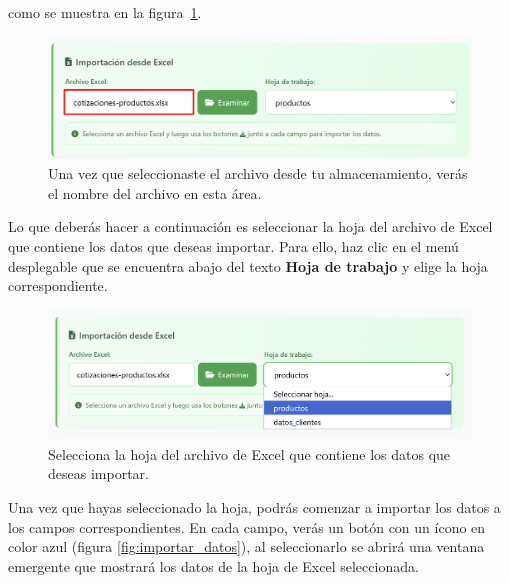 \documentclass{Pretexto/bluereport}
\begin{document}
\begin{minipage}
como se muestra en la figura~\ref{fig:archivos_cargados}.
\begin{figure}[H] 
    \centering
        \includegraphics[width=0.7\linewidth]{img/archivos_cargados.png}
    \caption{Una vez que seleccionaste el archivo desde tu almacenamiento, verás el nombre del archivo en esta área.}
    \label{fig:archivos_cargados}
\end{figure}
Lo que deberás hacer a continuación es seleccionar la hoja del archivo de Excel que contiene los datos que deseas importar. 
Para ello, haz clic en el menú desplegable que se encuentra abajo del texto  \textbf{Hoja de trabajo} y elige la hoja correspondiente.
\begin{figure}[H] 
    \centering
        \includegraphics[width=0.7\linewidth]{img/seleccionar_hoja.png}
    \caption{Selecciona la hoja del archivo de Excel que contiene los datos que deseas importar.}
    \label{fig:seleccionar_hoja}
\end{figure}

Una vez que hayas seleccionado la hoja, podrás comenzar a importar los datos a los campos correspondientes.
En cada campo, verás un botón con un ícono en color azul (figura \ref{fig:importar_datos}), al seleccionarlo
 se abrirá una ventana emergente que mostrará los datos de la hoja de Excel seleccionada.
 

\end{minipage}
\end{document}
